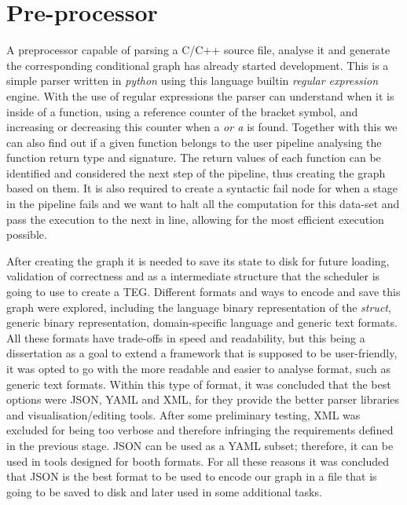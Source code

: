 \section{Pre-processor}

\par A preprocessor  capable of parsing a C/C++ source file, analyse it and generate the corresponding conditional graph has already started development. 
This is a simple parser written in \textit{python} using this language builtin \textit{regular expression} engine. With the use of regular expressions the parser can understand when it is inside of a function, using a reference counter of the bracket symbol, and increasing or decreasing this counter when a \textit{{} or a \textit{}} is found. Together with this we can also find out if a given function belongs to the user pipeline analysing the function return type and signature.
The return values of each function can be identified and considered the next step of the pipeline, thus creating the graph based on them. It is also required to create a syntactic fail node for when a stage in the pipeline fails and we want to halt all the computation for this data-set and pass the execution to the next in line, allowing for the most efficient execution possible.

After creating the graph it is needed to save its state to disk for future loading, validation of correctness and as a intermediate structure that the scheduler is going to use to create a TEG. 
Different formats and ways to encode and save this graph were explored, including the language binary representation of the \textit{struct}, generic binary representation, domain-specific language and generic text formats. All these formats have trade-offs in speed and readability, but this being a dissertation as a goal to extend a framework that is supposed to be user-friendly, it was opted to go with the more readable and easier to analyse format, such as generic text formats. Within this type of format, it was concluded that the best options were JSON, YAML and XML, for they provide the better parser libraries and visualisation/editing tools. 
After some preliminary testing, XML was excluded for being too verbose and therefore infringing the requirements defined in the previous stage. JSON can be used as a YAML subset; therefore, it can be used in tools designed for booth formats. For all these reasons it was concluded that JSON is the best format to be used to encode our graph in a file that is going to be saved to disk and later used in some additional tasks.


